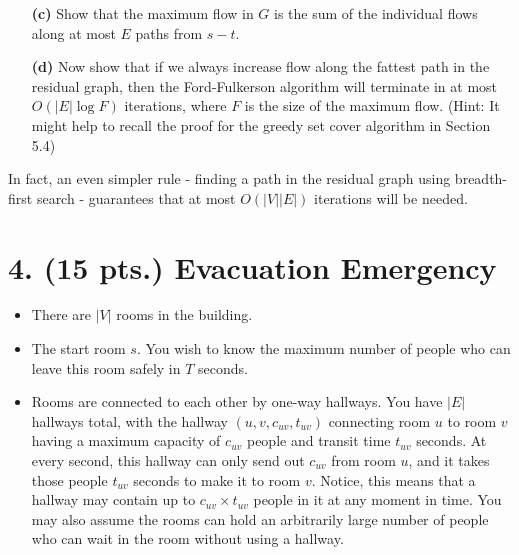 \documentclass[11pt]{article}
\begin{document}
\begin{itemize}
\item[{\bf (c)}] Show that the maximum flow in $G$ is the sum of the individual
  flows along at most $E$ paths from $s - t$.
  
  
  

\item[{\bf (d)}] Now show that if we always increase flow along the 
  fattest path in the residual graph, then the Ford-Fulkerson algorithm will 
  terminate in at most $O(|E|\log F)$ iterations, where $F$ is the size of the 
  maximum flow. (Hint: It might help to recall the proof for the greedy set 
  cover algorithm in Section 5.4)

\end{itemize}

In fact, an even simpler rule - finding a path in the residual graph using 
breadth-first search - guarantees that at most $O(|V||E|)$ iterations will 
be needed.

\label{pg:end-of-p3}

%

\newpage

\section*{4.  (15 pts.) Evacuation Emergency}

\begin{itemize}
  \item There are $|V|$ rooms in the building.
  \item The start room $s$. You wish to know the maximum number of people 
    who can leave this room safely in $T$ seconds.
  \item Rooms are connected to each other by one-way hallways. You have $|E|$
    hallways total, with the hallway $(u,v,c_{uv},t_{uv})$ connecting room $u$
    to room $v$ having a maximum capacity of $c_{uv}$ people and transit 
    time $t_{uv}$ seconds. At every second, this hallway can only send out 
    $c_{uv}$ from room $u$, and it takes those people $t_{uv}$ seconds to make 
    it to room $v$. Notice, this means that a hallway may contain up to 
    $c_{uv} \times t_{uv}$ people in it at any moment in time. 
    You may also assume the rooms can hold an arbitrarily large number of 
    people who can wait in the room without using a hallway.
\end{itemize}
\end{document}
